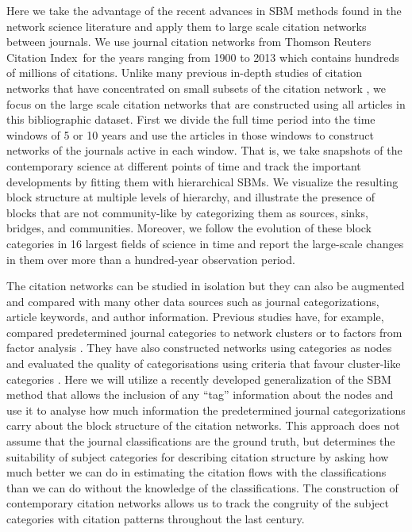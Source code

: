 \documentclass[a4paper,12pt]{article}
\begin{document}
Here we take the advantage of the recent advances in SBM methods found in the network science literature and apply them to large scale citation networks between journals.
We use journal citation networks from Thomson Reuters Citation Index\textregistered~for the years ranging from 1900 to 2013 which contains hundreds of millions of citations. 
Unlike many previous in-depth studies of citation networks that have concentrated on small subsets of the citation network \citep{Pieters1999,Grossman2002,An2004,Nerur2005,Porter2009,Zhang2010,Shibata2011}, we 
focus on the large scale citation networks that are constructed using all articles in this bibliographic dataset. First we divide the full time period into the time windows of 5 or 10 years and use the articles in those windows to construct networks of the journals active in each window. That is, we take snapshots of the contemporary science at different points of time and track the important developments by fitting them with hierarchical SBMs. 
We visualize the resulting block structure at multiple levels of hierarchy, and illustrate the presence of blocks that are not community-like by categorizing them as sources, sinks, bridges, and communities. Moreover, we follow the evolution of these block categories in 16 largest fields of science in time and report  the 
large-scale changes in them over more than a hundred-year observation period.

The citation networks can be studied in isolation but they can also be augmented and compared with many other data sources such as journal categorizations, article keywords, and author information. Previous studies have, for example, compared predetermined journal categories to network clusters \citep{Boyack2005, Janssens2009} or to factors from factor analysis \citep{Leydesdorff2009}. They have also constructed networks using categories as nodes \citep{Zhang2010} and evaluated the quality of categorisations using criteria that favour cluster-like categories \citep{Wang2016}. Here we will utilize a recently developed generalization of the SBM method that allows the inclusion of any ``tag'' information about the nodes \citep{Hric2016} and use it to analyse how much information the predetermined journal categorizations carry about the block structure of the citation networks. This approach does not assume that the journal classifications are the ground truth, but determines the suitability of subject categories for describing citation structure by asking how much better we can do in estimating the citation flows with the classifications than we can do without the knowledge of the classifications. The construction of contemporary citation networks allows us to track the congruity of the subject categories with citation patterns throughout the last century.
\end{document}
